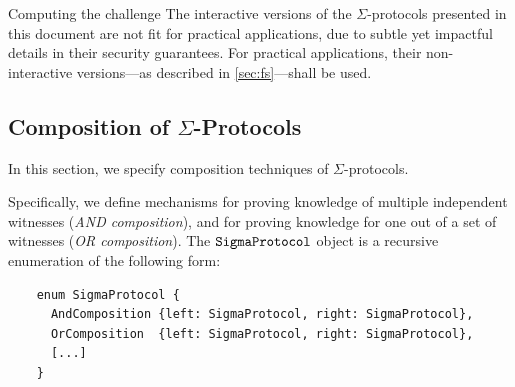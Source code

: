 \documentclass[11pt]{article}
\begin{document}



\begin{remark}{Computing the challenge}{}
  The interactive versions of the $\Sigma$-protocols presented in this document are not fit for practical applications, due to subtle yet impactful details in their security guarantees.
 For practical applications, their non-interactive versions---as described in \cref{sec:fs}---shall be used.
\end{remark}


\subsection{Composition of $\Sigma$-Protocols}
\label{sec:composition}
\label{sec:or-comp}
\label{sec:and-comp}
  In this section, we specify composition techniques of $\Sigma$-protocols.

  Specifically, we define mechanisms for proving knowledge of multiple independent witnesses (\emph{AND composition}), and for proving knowledge for one out of a set of witnesses (\emph{OR composition}). The $\texttt{SigmaProtocol}$ object is a recursive enumeration of the following form:

  \begin{verbatim}
    enum SigmaProtocol {
      AndComposition {left: SigmaProtocol, right: SigmaProtocol},
      OrComposition  {left: SigmaProtocol, right: SigmaProtocol},
      [...]
    }
  \end{verbatim}
\end{document}
